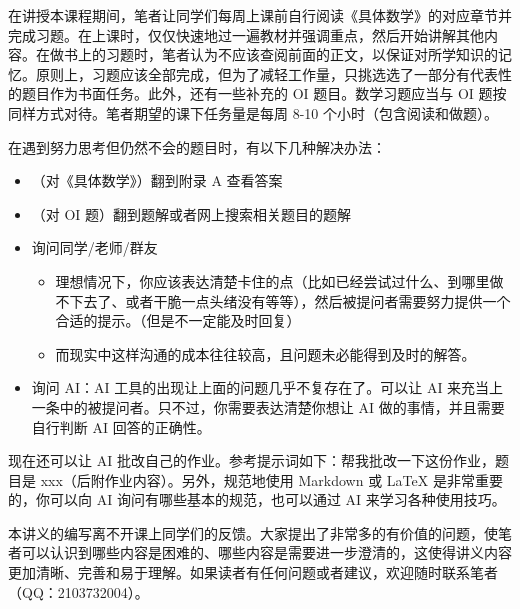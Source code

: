 在讲授本课程期间，笔者让同学们每周上课前自行阅读《具体数学》的对应章节并完成习题。在上课时，仅仅快速地过一遍教材并强调重点，然后开始讲解其他内容。在做书上的习题时，笔者认为不应该查阅前面的正文，以保证对所学知识的记忆。原则上，习题应该全部完成，但为了减轻工作量，只挑选选了一部分有代表性的题目作为书面任务。此外，还有一些补充的 OI 题目。数学习题应当与 OI 题按同样方式对待。笔者期望的课下任务量是每周 8-10 个小时（包含阅读和做题）。

在遇到努力思考但仍然不会的题目时，有以下几种解决办法：
    \begin{itemize}
        \item （对《具体数学》）翻到附录 A 查看答案
        \item （对 OI 题）翻到题解或者网上搜索相关题目的题解
        \item 询问同学/老师/群友
            \begin{itemize}
                \item 理想情况下，你应该表达清楚卡住的点（比如已经尝试过什么、到哪里做不下去了、或者干脆一点头绪没有等等），然后被提问者需要努力提供一个合适的提示。（但是不一定能及时回复）
                \item 而现实中这样沟通的成本往往较高，且问题未必能得到及时的解答。
            \end{itemize}
        \item 询问 AI：AI 工具的出现让上面的问题几乎不复存在了。可以让 AI 来充当上一条中的被提问者。只不过，你需要表达清楚你想让 AI 做的事情，并且需要自行判断 AI 回答的正确性。
    \end{itemize}
现在还可以让 AI 批改自己的作业。参考提示词如下：帮我批改一下这份作业，题目是 xxx（后附作业内容）。另外，规范地使用 Markdown 或 LaTeX 是非常重要的，你可以向 AI 询问有哪些基本的规范，也可以通过 AI 来学习各种使用技巧。


本讲义的编写离不开课上同学们的反馈。大家提出了非常多的有价值的问题，使笔者可以认识到哪些内容是困难的、哪些内容是需要进一步澄清的，这使得讲义内容更加清晰、完善和易于理解。如果读者有任何问题或者建议，欢迎随时联系笔者（QQ：2103732004）。

